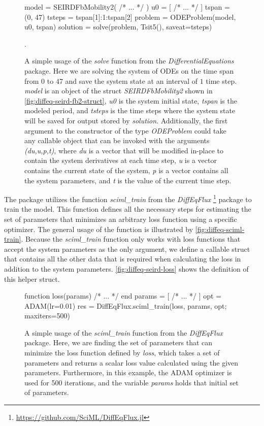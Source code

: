 \begin{figure}[!htb]
\begin{jllisting}
model = SEIRDFbMobility2( /* ... */ )
u0 = [ /* ... */ ]
tspan = (0, 47)
tsteps = tspan[1]:1:tspan[2]
problem = ODEProblem(model, u0, tspan)
solution = solve(problem, Tsit5(), saveat=tsteps)
\end{jllisting}
\caption{A simple usage of the \textit{solve} function from the \textit{DifferentialEquations} package. Here we are solving the system of \glspl{ODE} on the time span from $0$ to $47$ and save the system state at an interval of $1$ time step. \textit{model} is an object of the struct \textit{SEIRDFbMobility2} shown in \autoref{fig:diffeq-seird-fb2-struct}, \textit{u0} is the system initial state, \textit{tspan} is the modeled period, and \textit{tsteps} is the time steps where the system state will be saved for output stored by \textit{solution}. Additionally, the first argument to the constructor of the type \textit{ODEProblem} could take any callable object that can be invoked with the arguments \textit{(du,u,p,t)}, where \textit{du} is a vector that will be modified in-place to contain the system derivatives at each time step, \textit{u} is a vector contains the current state of the system, \textit{p} is a vector contains all the system parameters, and \textit{t} is the value of the current time step.}.
\label{fig:diffeq-solve-usage}
\end{figure}

The package utilizes the function \textit{sciml\_train} from the \textit{DiffEqFlux} \footnote{\url{https://github.com/SciML/DiffEqFlux.jl}} package to train the model.
This function defines all the necessary steps for estimating the set of parameters that minimizes an arbitrary loss function using a specific optimizer.
The general usage of the function is illustrated by \autoref{fig:diffeq-sciml-train}.
Because the \textit{sciml\_train} function only works with loss functions that accept the system parameters as the only argument, we define a callable struct that contains all the other data that is required when calculating the loss in addition to the system parameters.
\autoref{fig:diffeq-seird-loss} shows the definition of this helper struct.

\begin{figure}[!htb]
\begin{jllisting}
function loss(params)
    /* ... */
end
params = [ /* ... */ ]
opt = ADAM(lr=0.01)
res = DiffEqFlux.sciml_train(loss, params, opt; maxiters=500)
\end{jllisting}
\caption{A simple usage of the \textit{sciml\_train} function from the \textit{DiffEqFlux} package. Here, we are finding the set of parameters that can minimize the loss function defined by \textit{loss}, which takes a set of parameters and returns a scalar loss value calculated using the given parameters. Furthermore, in this example, the ADAM optimizer is used for 500 iterations, and the variable \textit{params} holds that initial set of parameters.}
\label{fig:diffeq-sciml-train}
\end{figure}

